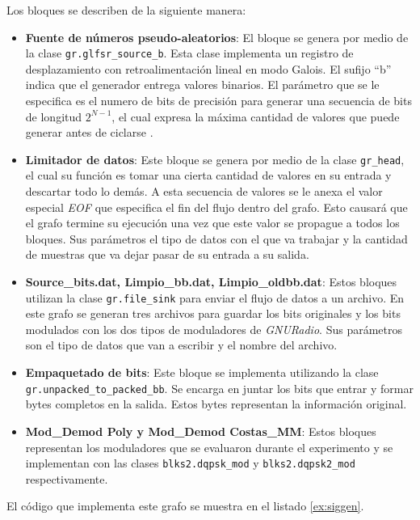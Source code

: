 Los bloques se describen de la siguiente manera:

\begin{itemize}
  \item \textbf{Fuente de n\'umeros pseudo-aleatorios}: El bloque se genera por medio de la clase
  \verb|gr.glfsr_source_b|. Esta clase implementa un registro de desplazamiento con
  retroalimentaci\'on lineal en modo Galois. El sufijo ``b'' indica que el generador entrega valores
  binarios. El par\'ametro que se le especifica es el numero de bits de precisi\'on para generar
  una secuencia de bits de longitud $2^{N-1}$, el cual expresa la m\'axima cantidad de valores
  que puede generar antes de ciclarse \cite{xilinx}. 
  \item \textbf{Limitador de datos}: Este bloque se genera por medio de la clase \verb|gr_head|, el
  cual su funci\'on es tomar una cierta cantidad de valores en su entrada y descartar todo lo
  dem\'as. A esta secuencia de valores se le anexa el valor especial \emph{EOF} que especifica el
  fin del flujo dentro del grafo. Esto causar\'a que el grafo termine su ejecuci\'on una vez que
  este valor se propague a todos los bloques. Sus par\'ametros el tipo de datos con el que va
  trabajar y la cantidad de muestras que va dejar pasar de su entrada a su salida.
  \item \textbf{Source\_bits.dat, Limpio\_bb.dat, Limpio\_oldbb.dat}: Estos bloques utilizan la
  clase \verb|gr.file_sink| para enviar el flujo de datos a un archivo. En este grafo se generan tres
  archivos para guardar los bits originales y los bits modulados con los dos tipos de moduladores
  de \emph{GNURadio}. Sus par\'ametros son el tipo de datos que van a escribir y el nombre del
  archivo.
  \item \textbf{Empaquetado de bits}: Este bloque se implementa utilizando la clase \\
  \verb|gr.unpacked_to_packed_bb|. Se encarga en juntar los bits que entrar y formar bytes completos
  en la salida. Estos bytes representan la informaci\'on original.
  \item \textbf{Mod\_Demod Poly y Mod\_Demod Costas\_MM}: Estos bloques representan los moduladores
  que se evaluaron durante el experimento y se implementan con las clases \verb|blks2.dqpsk_mod| y
  \verb|blks2.dqpsk2_mod| respectivamente.
\end{itemize}

El c\'odigo que implementa este grafo se muestra en el listado \ref{ex:siggen}.

